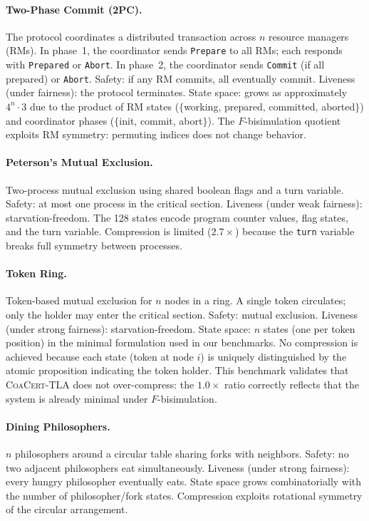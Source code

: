 \documentclass[11pt]{article}
\newcommand{\CoaCert}{\textsc{CoaCert-TLA}}
\begin{document}
\paragraph{Two-Phase Commit (2PC).}
The protocol coordinates a distributed transaction across $n$ resource
managers (RMs).
In phase~1, the coordinator sends \texttt{Prepare} to all RMs; each
responds with \texttt{Prepared} or \texttt{Abort}.
In phase~2, the coordinator sends \texttt{Commit} (if all prepared) or
\texttt{Abort}.
Safety: if any RM commits, all eventually commit.
Liveness (under fairness): the protocol terminates.
State space: grows as approximately $4^n \cdot 3$ due to the product of
RM states ($\{$working, prepared, committed, aborted$\}$) and coordinator
phases ($\{$init, commit, abort$\}$).
The $F$-bisimulation quotient exploits RM symmetry: permuting indices
does not change behavior.

\paragraph{Peterson's Mutual Exclusion.}
Two-process mutual exclusion using shared boolean flags and a turn
variable.
Safety: at most one process in the critical section.
Liveness (under weak fairness): starvation-freedom.
The 128 states encode program counter values, flag states, and the turn
variable.
Compression is limited ($2.7\times$) because the \texttt{turn} variable
breaks full symmetry between processes.

\paragraph{Token Ring.}
Token-based mutual exclusion for $n$ nodes in a ring.
A single token circulates; only the holder may enter the critical section.
Safety: mutual exclusion.
Liveness (under strong fairness): starvation-freedom.
State space: $n$ states (one per token position) in the minimal
formulation used in our benchmarks.
No compression is achieved because each state (token at node $i$) is
uniquely distinguished by the atomic proposition indicating the token
holder.
This benchmark validates that \CoaCert{} does not over-compress: the
$1.0\times$ ratio correctly reflects that the system is already minimal
under $F$-bisimulation.

\paragraph{Dining Philosophers.}
$n$ philosophers around a circular table sharing forks with neighbors.
Safety: no two adjacent philosophers eat simultaneously.
Liveness (under strong fairness): every hungry philosopher eventually eats.
State space grows combinatorially with the number of philosopher/fork
states.
Compression exploits rotational symmetry of the circular arrangement.
\end{document}
